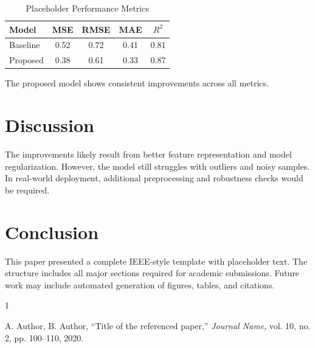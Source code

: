 \documentclass[conference]{IEEEtran}
\begin{document}
	\begin{table}[h]
		\centering
		\caption{Placeholder Performance Metrics}
		\begin{tabular}{lcccc}
			\toprule
			Model & MSE & RMSE & MAE & $R^2$ \\
			\midrule
			Baseline & 0.52 & 0.72 & 0.41 & 0.81 \\
			Proposed & 0.38 & 0.61 & 0.33 & 0.87 \\
			\bottomrule
		\end{tabular}
		\label{tab:results}
	\end{table}
	
	The proposed model shows consistent improvements across all metrics.
	
	\section{Discussion}
	The improvements likely result from better feature representation and model regularization. However, the model still struggles with outliers and noisy samples. In real-world deployment, additional preprocessing and robustness checks would be required.
	
	\section{Conclusion}
	This paper presented a complete IEEE-style template with placeholder text. The structure includes all major sections required for academic submissions. Future work may include automated generation of figures, tables, and citations.
	
	\begin{thebibliography}{1}
		
		A. Author, B. Author, ``Title of the referenced paper,'' \emph{Journal Name}, vol. 10, no. 2, pp. 100--110, 2020.
		
	\end{thebibliography}
	
\end{document}
